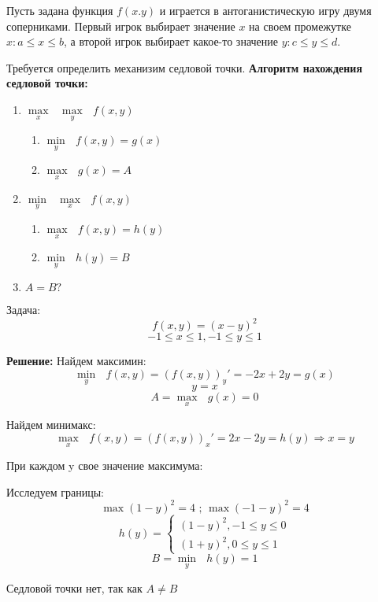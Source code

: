 \documentclass[aps,%
12pt,%
final,%
oneside,
onecolumn,%
musixtex, %
superscriptaddress,%
centertags]{article} %
\begin{document}
Пусть задана функция $f(x.y)$ и играется в антоганистическую игру двумя соперниками. 
Первый игрок выбирает значение $x$ на своем промежутке $x:a \leq x \leq b$, а второй игрок выбирает какое-то значение $y: c \leq y \leq d$. 

Требуется определить механизим седловой точки.\newpage
\textbf{Алгоритм нахождения седловой точки:}

\begin{enumerate}
  \item $ \underset{x}{\max} \text{ }\underset{y}{\max} \text{ }  f(x,y) $
  \begin{enumerate}
    \item $ \underset{y}{\min} \text{ } f(x,y) = g(x) $
    \item $ \underset{x}{\max} \text{ } g(x) = A $
  \end{enumerate}
  \item $ \underset{y}{\min} \text{ }\underset{x}{\max} \text{ }  f(x,y) $
  \begin{enumerate}
    \item $ \underset{x}{\max} \text{ } f(x,y) = h(y) $
    \item $ \underset{y}{\min} \text{ } h(y) = B $
  \end{enumerate}
  \item $A = B ?$

\end{enumerate}

Задача:
$$ f(x,y) = (x-y)^2 $$
$$ -1 \leq x \leq 1,-1 \leq y \leq 1 $$

\textbf{Решение:}
Найдем максимин:
$$ \underset{y}{\min} \text{ } f(x,y) = (f(x,y))_y'  = -2x + 2y = g(x)$$
$$ y = x $$
$$ A = \underset{x}{\max} \text{ } g(x) = 0 $$

Найдем минимакс:
$$ \underset{x}{\max} \text{ } f(x,y) = (f(x,y))_x'  = 2x -  2y = h(y) \Rightarrow x = y$$

При каждом y свое значение максимума:

Исследуем границы:
$$ \max (1-y)^2 = 4 \text{ ;  } \max (-1-y)^2 = 4 $$
$$h(y) = \left\{\begin{matrix}
(1-y)^2, -1 \leq y \leq 0\\ 
(1+y)^2, 0 \leq y \leq 1
\end{matrix}\right.$$
$$ B = \underset{y}{\min} \text{ } h(y) = 1 $$

Седловой точки нет, так как $A \neq B$
\end{document}
